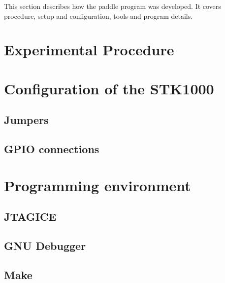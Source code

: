 This section describes how the paddle program was developed.
It covers procedure, setup and configuration, tools and program details.

\section{Experimental Procedure}
    
    

\section{Configuration of the STK1000}

    \subsection{Jumpers}

        

   \subsection{GPIO connections}

        

\section{Programming environment}

    \subsection{JTAGICE}

        

    \subsection{GNU Debugger}

        

    \subsection{Make}

        

